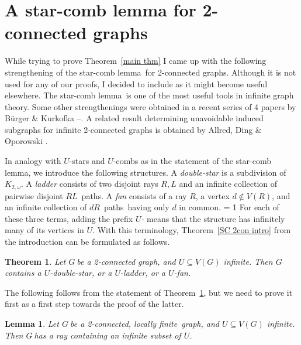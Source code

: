 \documentclass{article}
\newcommand{\Debug}{0}
\newcommand{\defi}[1]{{\color{darkgray}\emph{#1}}}
\newtheorem{theorem}[proposition]{Theorem}
\newtheorem{lemma}[proposition]{Lemma}
\newcommand{\pths}[2]{\ensuremath{#1}\text{--}\ensuremath{#2}~paths}
\newcommand{\g}{\ensuremath{G\ }}
\newcommand{\Tr}[1]{Theorem~\ref{#1}}
\newcommand{\lf}{locally finite}
\newcommand{\scl}{star-comb lemma}
\newcommand{\mymargin}[1]{\ifnum \Debug = 1
  \marginpar{\begin{minipage}{\marginparwidth}\small \begin{flushleft}{\color{blue}#1}\end{flushleft}\end{minipage}}\fi
}
\begin{document}
\section{A star-comb lemma for 2-connected graphs} \label{sec SC}

While trying to prove \Tr{main thm} I came up with the following strengthening of the \scl\ for 2-connected graphs. Although it is not used for any of our proofs, I decided to include as it might become useful elsewhere. The \scl\ is one of the most useful tools in infinite graph theory. Some other strengthenings were obtained in a recent series of 4 papers by B\"urger \& Kurkofka \cite{BurKurDuaI}--\cite{BurKurDuaIV}. A related result determining unavoidable induced subgraphs for infinite 2-connected graphs is obtained by Allred, Ding \& Oporowski \cite{AlDiOpUna}. 

In analogy with $U$-stars and $U$-combs as in the statement of the \scl, we introduce the following structures. A \defi{double-star} is a subdivision of $K_{2,\omega}$. A \defi{ladder} consists of two disjoint rays $R,L$ and an infinite collection of pairwise disjoint \pths{R}{L}. A \defi{fan} consists of a ray $R$, a vertex $d\not\in V(R)$, and an infinite collection of \pths{d}{R}\ having only $d$ in common. \mymargin{(\fig{})} For each of these three terms, adding the prefix \defi{$U$-} means that the structure has infinitely many of its vertices in $U$. With this terminology, \Tr{SC 2con intro} from the introduction can be formulated as follows.


\begin{theorem} \label{SC 2con}
Let \g be a 2-connected graph, and $U\subseteq V(G)$ infinite. Then \g contains a $U$-double-star, or a $U$-ladder, or a $U$-fan. 
\end{theorem}




The following follows from the statement of \Tr{SC 2con}, but we need to prove it first as a first step towards the proof of the latter.
\begin{lemma} \label{comb 2con}
Let \g be a 2-connected, \lf\ graph, and $U\subseteq V(G)$ infinite. Then \g has a ray containing an infinite subset of $U$.
\end{lemma}
\end{document}
